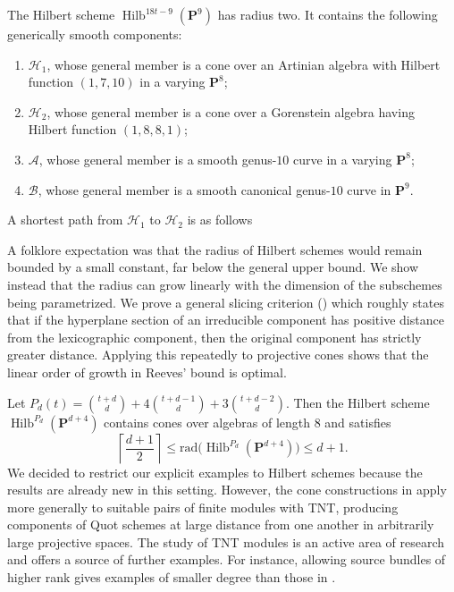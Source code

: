 \documentclass[leqno,11pt,a4paper]{amsart}
\newenvironment{customthm}[1]
  {\renewcommand\theinnercustomthm{#1}\innercustomthm}
  {\endinnercustomthm}
\theoremstyle{definition}
\numberwithin{equation}{section}
\newcommand{\rad}{\mathrm{rad}}
\newcommand{\PP}{\mathbf{P}}
\newcommand{\HH}{\mathcal{H}}
\DeclareMathOperator{\Hilb}{Hilb}
\begin{document}
\begin{customthm}{G}  
The Hilbert scheme $\Hilb^{18t-9}(\PP^9)$ has radius two.
It contains the following generically smooth components:
\begin{enumerate}
\item $\HH_1$, whose general member is a cone over an Artinian
algebra with Hilbert function $(1,7,10)$ in a varying $\PP^8$;
\item $\HH_2$, whose general member is a cone over a Gorenstein
algebra having Hilbert function $(1,8,8,1)$;
\item $\mathcal A$, whose general member is a smooth genus-$10$
curve in a varying $\PP^8$;
\item $\mathcal B$, whose general member is a smooth canonical
genus-$10$ curve in $\PP^9$.
\end{enumerate}
A shortest path from $\HH_1$ to $\HH_2$ is as follows
\begin{center}
\end{center}

\end{customthm}

A folklore expectation was that the radius of Hilbert schemes would remain bounded by a small constant, far below the general upper bound. 
We show instead that the radius can grow linearly with the dimension of the subschemes being parametrized. 
We prove a general slicing criterion () which roughly states that if the hyperplane section of an irreducible component has positive distance from the lexicographic component, then the original component has strictly greater distance.
Applying this repeatedly to projective cones shows that the linear order of growth in Reeves' bound is optimal.

\begin{customthm}{H}
Let $P_d(t)= \binom{t+d}{d} +4\binom{t+d-1}{d} +3\binom{t+d-2}{d}$.
Then the Hilbert scheme $\Hilb^{P_d}(\PP^{d+4})$ contains cones over algebras of length $8$ and satisfies $$
\left\lceil\frac{d+1}{2}\right\rceil \leq \rad\bigl(\Hilb^{P_d}(\PP^{d+4})\bigr) \leq d+1.
$$
\end{customthm}
We decided to restrict our explicit examples to Hilbert schemes because the results are already new
in this setting. 
However, the cone constructions in  apply more generally to suitable pairs of finite modules with TNT, producing components of Quot schemes at large distance from one another in arbitrarily large projective spaces. 
The study of TNT modules is an active area of research \cite{jelisiejew_sivic, Jelisiejew__Elementary,Satriano_Staal, SS24} and offers a source of further examples. For instance, allowing source bundles of higher rank gives examples of smaller degree than those in .
\end{document}
